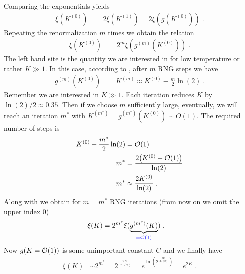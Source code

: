 Comparing the exponentials yields
\begin{align*}
\xi(K^{(0)}) &= 2 \xi(K^{(1)})=2 \xi(g(K^{(0)}))\;.
\end{align*}
Repeating the renormalization $m$ times we obtain the relation
\begin{align}\label{eq:corr:length}
 \xi(K^{(0)}) &= 2^{m} \xi(g^{(m)}(K^{(0)})) \;.
\end{align}
The left hand site is the quantity we are interested in for low temperature or rather $K\gg 1$. In this case, according to , after $m$ RNG steps we have
\begin{align*}
g^{(m)}(K^{(0)}) &= K^{(m)} \approx  K^{(0)} - \frac{m}{2} \ln(2)\;.
\end{align*}
Remember we are interested in $K\gg 1$. Each iteration reduces $K$ by $\ln(2)/2\approx 0.35$. Then
if we choose $m$ sufficiently large, eventually, we will reach an iteration $m^{*}$ with $K^{(m^{*})}=g^{(m^{*})}(K^{(0)})\sim O(1)$.
The required number of steps is
\begin{align*}
K^{(0)} - \frac{m^{*}}{2}\ln(2) &= \order{1}\\
m^{*} &= \frac{2 \big(K^{(0)}-\order{1}\big)}{\ln(2)} \\
m^{*} &\approx \frac{2 K^{(0)}}{\ln(2)}\;.
\end{align*}
Along with  we obtain for $m=m^{*}$ RNG iterations (from now on we omit the upper index 0)
\begin{align*}
 \xi(K) &= 2^{m^{*}} \xi(\underbrace{
g^{(m^{*})}(K)
}_{\color{blue} = \order{1}}) \;.
\end{align*}
Now $g(K=\order{1})$ is some unimportant constant $C$ and we finally have
\begin{align*}
 \xi(K) &\sim  2^{m^{*}} = 2^{\frac{2 K}{\ln(2)}} 
=  e^{\ln(2^{\frac{2 K}{\ln(2)}})} 
=  e^{2 K}\;.
\end{align*}


